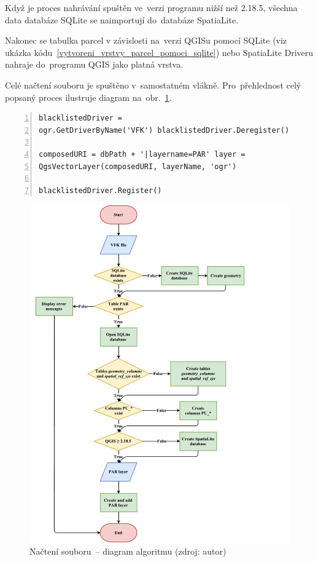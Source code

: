 Když je proces nahrávání spuštěn ve~verzi programu nižší než 2.18.5,
všechna data databáze SQLite se naimportují do~databáze SpatiaLite.

Nakonec se tabulka parcel v závislosti na~verzi QGISu pomocí SQLite
(viz ukázka kódu~\ref{vytvoreni_vrstvy_parcel_pomoci_sqlite}) nebo
SpatiaLite Driveru nahraje do~programu QGIS jako platná vrstva.

Celé načtení  souboru je spuštěno v~samostatném
vlákně. Pro~přehlednost celý popsaný proces ilustruje diagram
na~obr.~\ref{fig:diagram_nacitani_vfk}.

{\scriptsize
\begin{lstlisting}[style=python, caption={Vytvoření QGIS vrstvy parcel
pomocí SQLite Driveru}, captionpos=b,
label=vytvoreni_vrstvy_parcel_pomoci_sqlite, backgroundcolor =
\color{light-gray}, numbers=left] blacklistedDriver =
ogr.GetDriverByName('VFK') blacklistedDriver.Deregister()

composedURI = dbPath + '|layername=PAR' layer =
QgsVectorLayer(composedURI, layerName, 'ogr')
	
blacklistedDriver.Register()
\end{lstlisting}}

	\begin{figure}[H] \centering
		\includegraphics[width=1.2\textwidth]{./pictures/nacitani_vfk_souboru.pdf}
		\caption[Načtení  souboru~– diagram
algoritmu]{Načtení  souboru~– diagram algoritmu (zdroj: autor)}
		\label{fig:diagram_nacitani_vfk}
 	\end{figure}

